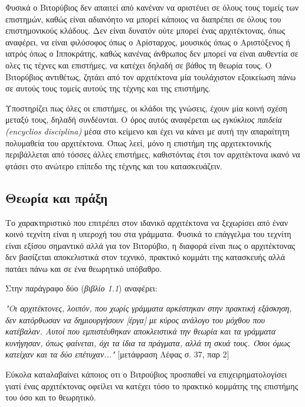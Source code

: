 Φυσικά ο Βιτορύβιος δεν απαιτεί από κανέναν να αριστέυει σε όλους τους τομείς των επιστημών, καθώς είναι αδιανόητο να μπορεί κάποιος να διαπρέπει σε όλους του επιστημονικούς κλάδους. Δεν είναι δυνατόν ούτε μπορεί ένας αρχιτέκτονας, όπως αναφέρει, να είναι φιλόσοφος όπως ο Αρίσταρχος, μουσικός όπως ο Αριστόξενος ή ιατρός όπως ο Ιπποκράτης, καθώς κανένας άνθρωπος δεν μπορεί να είναι αυθεντία σε ολες τις τέχνες και επιστήμες, να κατέχει δηλαδή σε βάθος τη θεωρία τους. Ο Βιτορύβιος αντιθέτως, ζητάει από τον αρχιτέκτονα μία τουλάχιστον εξοικείωση πάνω σε αυτούς τους τομείς αυτούς της τέχνης και της επιστήμης. \cite[45]{vitruvius-lefas} 

Υποστηρίζει πως όλες οι επιστήμες, οι κλάδοι της γνώσεις, έχουν μία κοινή σχέση μεταξύ τους, δηλαδή συνδέονται. Ο όρος αυτός αναφέρεται ως \emph{εγκύκλιος παιδεία (encyclios disciplina)} μέσα στο κείμενο και έχει να κάνει με αυτή την απαραίτητη πολυμαθεία του αρχιτέκτονα. Όπως λεεί, μόνο η επιστήμη της αρχιτεκτονικής περιβάλλεται από τόσσες άλλες επιστήμες, καθιστόντας έτσι τον αρχιτέκτονα ικανό να φτάσει στο ανώτερο επίπεδο της τέχνης και του κατασκευάζειν. \cite[σ. 45]{vitruvius-lefas}

\subsection{Θεωρία και πράξη}

Το χαρακτηριστικό που επιτρέπει στον  ιδανικό αρχιτέκτονα να ξεχωρίσει από έναν κοινό τεχνίτη είναι η υπεροχή του στα γράμματα. \cite[σ. 9]{masterson_status_2004} Φυσικά το επάγγελμα του τεχνίτη είναι εξίσου σημαντικό αλλά για τον Βιτορύβιο, η διαφορά είναι πως ο αρχιτέκτονας δεν βασίζεται αποκελιστικά στον τεχνικό, πρακτικό κομμάτι της κατασκευής αλλά πατάει πάνω και σε ένα θεωρητικό υπόβαθρο. 

Στην παράγραφο δύο (\emph{βιβλίο 1.1}) αναφέρει:

\textit{"Οι αρχιτέκτονες, λοιπόν, που χωρίς γράμματα αρκέστηκαν στην πρακτική εξάσκηση,  δεν κατόρθωσαν να δημιουργήσουν [έργα] με κύρος ανάλογο του μόχθου που κατέβαλαν. Αυτοί που εμπιστέυθηκαν αποκλειστικά την θεωρία και τα γράμματα κυνήγησαν, όπως φαίνεται, όχι τα ίδια τα πράγματα, αλλά τη σκυά τους. Όσοι όμως κατείχαν και τα δύο επέτυχαν..."} [μετάφραση Λέφας σ. 37, παρ 2]

Εύκολα καταλαβαίνει κάποιος οτι ο Βιτρούβιος προσπαθεί να επιχειρηματολογίσει γιατί ένας αρχιτέκτονας οφείλει να κατέχει τόσο το πρακτικό κομμάτης της επιστήμης του όσο και το θεωρητικό.

